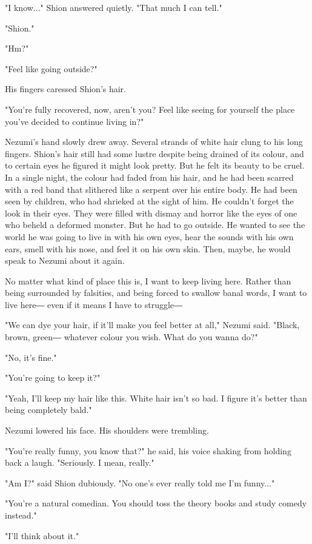 "I know..." Shion answered quietly. "That much I can tell."

"Shion."

"Hm?"

"Feel like going outside?"

His fingers caressed Shion's hair.

"You're fully recovered, now, aren't you? Feel like seeing for yourself
the place you've decided to continue living in?"

Nezumi's hand slowly drew away. Several strands of white hair clung to
his long fingers. Shion's hair still had some lustre despite being
drained of its colour, and to certain eyes he figured it might look
pretty. But he felt its beauty to be cruel. In a single night, the
colour had faded from his hair, and he had been scarred with a red band
that slithered like a serpent over his entire body. He had been seen by
children, who had shrieked at the sight of him. He couldn't forget the
look in their eyes. They were filled with dismay and horror like the
eyes of one who beheld a deformed monster. But he had to go outside. He
wanted to see the world he was going to live in with his own eyes, hear
the sounds with his own ears, smell with his nose, and feel it on his
own skin. Then, maybe, he would speak to Nezumi about it again.

No matter what kind of place this is, I want to keep living here. Rather
than being surrounded by falsities, and being forced to swallow banal
words, I want to live here― even if it means I have to struggle―

"We can dye your hair, if it'll make you feel better at all," Nezumi
said. "Black, brown, green― whatever colour you wish. What do you wanna
do?"

"No, it's fine."

"You're going to keep it?"

"Yeah, I'll keep my hair like this. White hair isn't so bad. I figure
it's better than being completely bald."

Nezumi lowered his face. His shoulders were trembling.

"You're really funny, you know that?" he said, his voice shaking from
holding back a laugh. "Seriously. I mean, really."

"Am I?" said Shion dubiously. "No one's ever really told me I'm
funny..."

"You're a natural comedian. You should toss the theory books and study
comedy instead."

"I'll think about it."

